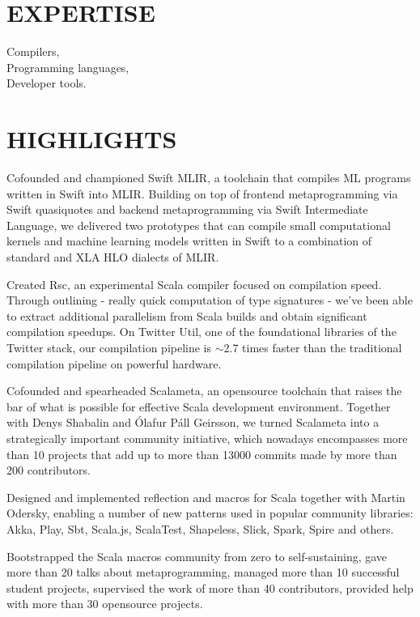 \documentclass[margin, 10pt]{Stylesheet}
\begin{document}
\begin{resume}

\section{EXPERTISE}

Compilers,\\
Programming languages,\\
Developer tools.

\section{HIGHLIGHTS}

Cofounded and championed Swift MLIR, a toolchain that compiles ML programs written
in Swift into MLIR. Building on top of frontend metaprogramming via Swift quasiquotes
and backend metaprogramming via Swift Intermediate Language, we delivered
two prototypes that can compile small computational kernels and machine learning
models written in Swift to a combination of standard and XLA HLO dialects of MLIR.

Created Rsc, an experimental Scala compiler focused on compilation speed. Through outlining - really
quick computation of type signatures - we've been able to extract additional parallelism from Scala
builds and obtain significant compilation speedups. On Twitter Util, one of the foundational
libraries of the Twitter stack, our compilation pipeline is $\sim$2.7 times faster than the
traditional compilation pipeline on powerful hardware.

Cofounded and spearheaded Scalameta, an opensource toolchain that raises the bar of what is possible
for effective Scala development environment. Together with Denys Shabalin and \'{O}lafur P\'{a}ll
Geirsson, we turned Scalameta into a strategically important community initiative, which nowadays
encompasses more than 10 projects that add up to more than 13000 commits made by more than 200
contributors.

Designed and implemented reflection and macros for Scala together with Martin Odersky,
enabling a number of new patterns used in popular community libraries:
Akka, Play, Sbt, Scala.js, ScalaTest, Shapeless, Slick, Spark, Spire and others.

Bootstrapped the Scala macros community from zero to self-sustaining, gave more than 20 talks about
metaprogramming, managed more than 10 successful student projects, supervised the work of more than
40 contributors, provided help with more than 30 opensource projects.


\end{resume}
\end{document}
